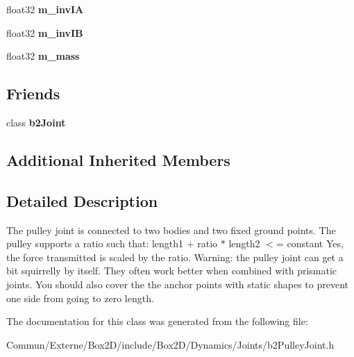 \begin{DoxyCompactItemize}
\item 
float32 {\bfseries m\+\_\+inv\+IA}\hypertarget{classb2_pulley_joint_a701fbc685109f5b397b968be2407b123}{}\label{classb2_pulley_joint_a701fbc685109f5b397b968be2407b123}

\item 
float32 {\bfseries m\+\_\+inv\+IB}\hypertarget{classb2_pulley_joint_a19278e2f7dcec7275aff55b1d760b398}{}\label{classb2_pulley_joint_a19278e2f7dcec7275aff55b1d760b398}

\item 
float32 {\bfseries m\+\_\+mass}\hypertarget{classb2_pulley_joint_a60efdc42d9fd8f4c50f96eb68ff3f191}{}\label{classb2_pulley_joint_a60efdc42d9fd8f4c50f96eb68ff3f191}

\end{DoxyCompactItemize}
\subsection*{Friends}
\begin{DoxyCompactItemize}
\item 
class {\bfseries b2\+Joint}\hypertarget{classb2_pulley_joint_a54ade8ed3d794298108d7f4c4e4793fa}{}\label{classb2_pulley_joint_a54ade8ed3d794298108d7f4c4e4793fa}

\end{DoxyCompactItemize}
\subsection*{Additional Inherited Members}


\subsection{Detailed Description}
The pulley joint is connected to two bodies and two fixed ground points. The pulley supports a ratio such that\+: length1 + ratio $\ast$ length2 $<$= constant Yes, the force transmitted is scaled by the ratio. Warning\+: the pulley joint can get a bit squirrelly by itself. They often work better when combined with prismatic joints. You should also cover the the anchor points with static shapes to prevent one side from going to zero length. 

The documentation for this class was generated from the following file\+:\begin{DoxyCompactItemize}
\item 
Commun/\+Externe/\+Box2\+D/include/\+Box2\+D/\+Dynamics/\+Joints/b2\+Pulley\+Joint.\+h\end{DoxyCompactItemize}

